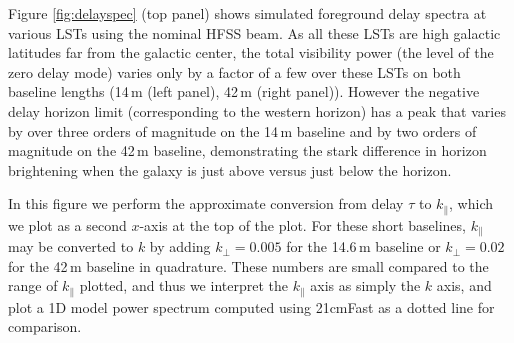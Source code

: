 \documentclass{emulateapj}
\begin{document}
Figure \ref{fig:delayspec} (top panel) shows simulated foreground delay spectra at various LSTs using the nominal HFSS beam. As all these LSTs are high galactic latitudes far from the galactic center, the total visibility power (the level of the zero delay mode) varies only by a factor of a few over these LSTs on both baseline lengths (14\,m (left panel), 42\,m (right panel)). However the negative delay horizon limit (corresponding to the western horizon) has a peak that varies by over three orders of magnitude on the 14\,m baseline and by two orders of magnitude on the 42\,m baseline, demonstrating the stark difference in horizon brightening when the galaxy is just above versus just below the horizon. 

In this figure we perform the approximate conversion from delay $\tau$ to $k_\parallel$, which we plot as a second $x$-axis at the top of the plot. For these short baselines, $k_\parallel$ may be converted to $k$ by adding $k_\perp=0.005$ for the 14.6\,m baseline or $k_\perp=0.02$ for the 42\,m baseline in quadrature. These numbers are small compared to the range of $k_\parallel$ plotted, and thus we interpret the $k_\parallel$ axis as simply the $k$ axis, and plot a 1D model power spectrum computed using 21cmFast \citep{21cmfast} as a dotted line for comparison. 
\end{document}
